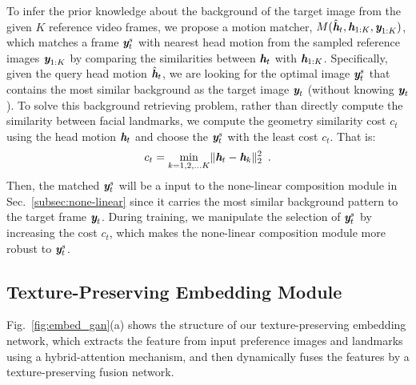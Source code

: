 \documentclass[runningheads]{llncs}
\def\mathbi#1{\textbf{\em #1}}
\begin{document}
\indent   To infer the prior knowledge about the background of the target image from the given $K$ reference video frames, we propose a motion matcher, $M(\hat{\mathbi{h}}_t, \mathbi{h}_{1:K}, \mathbi{y}_{1:K})$, which matches a frame $\mathbi{y}_t^s$ with nearest head motion from the sampled reference images $\mathbi{y}_{1:K}$ by comparing the similarities between $\mathbi{h}_{t}$ with $\mathbi{h}_{1:K}$. Specifically, given the query head motion $\hat{\mathbi{h}}_t$, we are looking for the optimal image $\mathbi{y}_t^s$ that contains the most similar background as the target image $\mathbi{y}_t$ (without knowing $\mathbi{y}_t$). To solve this background retrieving problem, rather than directly compute the similarity between facial landmarks, we compute the geometry similarity cost $c_{t}$ using the head motion $\mathbi{h}_t$ and choose the $\mathbi{y}_t^s$ with the least cost $c_t$. That is:
\begin{equation}
\begin{aligned}
c_{t}= \min_{k=1,2,...K}  \lVert \mathbi{h}_t - \mathbi{h}_k \rVert^2_2 \enspace.
\end{aligned}
\label{eq:cost}    
\end{equation}
  Then, the matched $\mathbi{y}_t^s$ will be a input to the none-linear composition module in Sec.~\ref{subsec:none-linear} since it carries the most similar background pattern to the target frame ${\mathbi{y}}_t$. During training, we manipulate the selection of $\mathbi{y}_t^s$ by increasing the cost $c_{t}$, which makes the none-linear composition module more robust to $\mathbi{y}_t^s$.  
 
\subsection{Texture-Preserving Embedding Module}
\label{subsec:details}
Fig.~\ref{fig:embed_gan}(a) shows the structure of our  texture-preserving embedding network, which extracts the feature from input preference images and landmarks using a hybrid-attention mechanism, and then dynamically fuses the features by a texture-preserving fusion network. 
\end{document}
